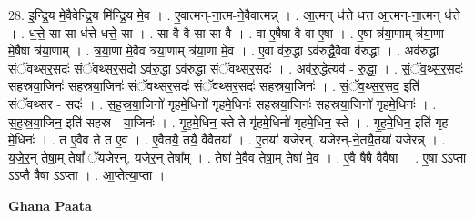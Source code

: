 \documentclass[17pt]{extarticle}
\begin{document}
28. इ॒न्द्रि॒य मे॒वैवेन्द्रि॒य मि॑न्द्रि॒य मे॒व । . ए॒वात्मन्-ना॒त्म-ने॒वैवात्मन्न् । . आ॒त्मन् ध॑त्ते धत्त आ॒त्मन्-ना॒त्मन् ध॑त्ते । . ध॒त्ते॒ सा सा ध॑त्ते धत्ते॒ सा । . सा वै वै सा सा वै । . वा ए॒षैषा वै वा ए॒षा । . ए॒षा त्र॑या॒णाम् त्र॑या॒णा मे॒षैषा त्र॑या॒णाम् । . त्र॒या॒णा मे॒वैव त्र॑या॒णाम् त्र॑या॒णा मे॒व । . ए॒वा व॑रु॒द्धा ऽव॑रुद्धै॒वैवा व॑रुद्धा । . अव॑रुद्धा संॅवथ्सर॒सदः॑ संॅवथ्सर॒सदो ऽव॑रु॒द्धा ऽव॑रुद्धा संॅवथ्सर॒सदः॑ । . अव॑रु॒द्धेत्यव॑ - रु॒द्धा॒ । . सं॒ॅव॒थ्स॒र॒सदः॑ सहस्रया॒जिनः॑ सहस्रया॒जिनः॑ संॅवथ्सर॒सदः॑ संॅवथ्सर॒सदः॑ सहस्रया॒जिनः॑ । . सं॒ॅव॒थ्स॒र॒सद॒ इति॑ संॅवथ्सर - सदः॑ । . स॒ह॒स्र॒या॒जिनो॑ गृहमे॒धिनो॑ गृहमे॒धिनः॑ सहस्रया॒जिनः॑ सहस्रया॒जिनो॑ गृहमे॒धिनः॑ । . स॒ह॒स्र॒या॒जिन॒ इति॑ सहस्र - या॒जिनः॑ । . गृ॒ह॒मे॒धिन॒ स्ते ते गृ॑हमे॒धिनो॑ गृहमे॒धिन॒ स्ते । . गृ॒ह॒मे॒धिन॒ इति॑ गृह - मे॒धिनः॑ । . त ए॒वैव ते त ए॒व । . ए॒वैतयै॒ तयै॒ वैवैतया᳚ । . ए॒तया॑ यजेरन्. यजेरन्-ने॒तयै॒तया॑ यजेरन्न् । . य॒जे॒र॒न् तेषा॒म् तेषां᳚ ॅयजेरन्. यजेर॒न् तेषा᳚म् । . तेषा॑ मे॒वैव तेषा॒म् तेषा॑ मे॒व । . ए॒वै षैषै वैवैषा । . ए॒षा ऽऽप्ता ऽऽप्तै षैषा ऽऽप्ता । . आ॒प्तेत्या॒प्ता । \newline

\textbf{Ghana Paata } \newline
\end{document}
